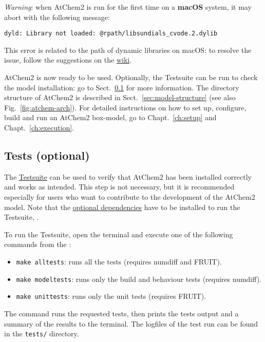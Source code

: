 \emph{Warning}: when AtChem2 is run for the first time on a
\textbf{macOS} system, it may abort with the following message:

\begin{verbatim}
dyld: Library not loaded: @rpath/libsundials_cvode.2.dylib
\end{verbatim}

This error is related to the path of dynamic libraries on macOS:
to resolve the issue, follow the suggestions on the
\href{https://github.com/AtChem/AtChem2/wiki/Known-Issues}{wiki}.

AtChem2 is now ready to be used. Optionally, the Testsuite can be run
to check the model installation: go to Sect.~\ref{subsec:tests-optional}
for more information. The directory structure of AtChem2 is described
in Sect.~\ref{sec:model-structure} (see also Fig.~\ref{fig:atchem-arch}).
For detailed instructions on how to set up, configure, build and
run an AtChem2 box-model, go to Chapt.~\ref{ch:setup} and
Chapt.~\ref{ch:execution}.

\subsection{Tests (optional)} \label{subsec:tests-optional}

The \hyperref[sec:test-suite]{Testsuite} can be used to verify that
AtChem2 has been installed correctly and works as intended. This step
is not necessary, but it is recommended especially for users who want
to contribute to the development of the AtChem2 model. Note that the
\hyperref[subsec:optional-dependencies]{optional dependencies} have to
be installed to run the Testsuite, .

To run the Testsuite, open the terminal and execute one of the
following commands from the \maindir:

\begin{itemize}
\item \verb|make alltests|: runs all the tests (requires numdiff and FRUIT).
\item \verb|make modeltests|: runs only the build and behaviour tests
  (requires numdiff).
\item \verb|make unittests|: runs only the unit tests (requires FRUIT).
\end{itemize}

The command runs the requested tests, then prints the tests output and
a summary of the results to the terminal. The logfiles of the test run
can be found in the \texttt{tests/} directory.

